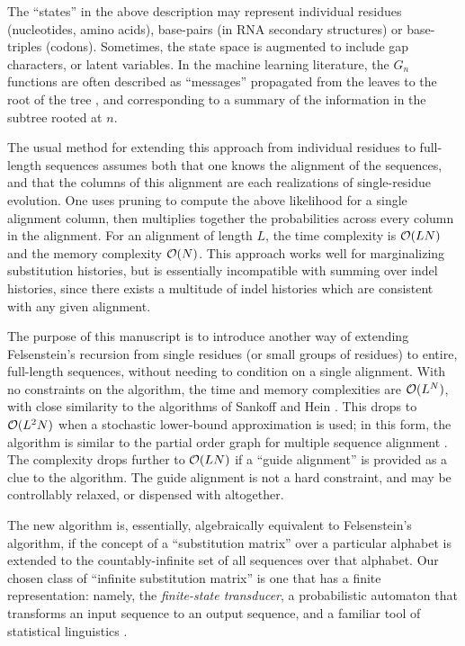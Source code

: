 \documentclass{article}
\begin{document}
The ``states'' in the above description may represent individual residues (nucleotides, amino acids), base-pairs (in RNA secondary structures) or base-triples (codons).
Sometimes, the state space is augmented to include gap characters, or latent variables.
In the machine learning literature, the $G_n$ functions are often described as ``messages'' propagated from the leaves to the root of the tree \cite{KschischangEtAl98},
and corresponding to a summary of the information in the subtree rooted at $n$.

The usual method for extending this approach from individual residues to full-length sequences assumes both that one knows the alignment of the sequences, 
and that the columns of this alignment are each realizations of single-residue evolution.  
One uses pruning to compute the above likelihood for a single alignment column,
then multiplies together the probabilities across every column in the alignment.
For an alignment of length $L$, the time complexity is ${\cal O}(LN)$ and the memory complexity ${\cal O}(N)$.
This approach works well for marginalizing substitution histories, but is essentially incompatible with summing over indel histories,
since there exists a multitude of indel histories which are consistent with any given alignment.

The purpose of this manuscript is to introduce another way of extending Felsenstein's recursion from single residues (or small groups of residues)
to entire, full-length sequences, without needing to condition on a single alignment.
With no constraints on the algorithm,
the time and memory complexities are ${\cal O}(L^N)$,
with close similarity to the algorithms of Sankoff \cite{SankoffCedergren83} and Hein \cite{Hein2001}.
This drops to ${\cal O}(L^2 N)$ when a stochastic lower-bound approximation is used; in this form,
the algorithm is similar to the partial order graph for multiple sequence alignment \cite{LeeGrassoSharlow2002}.
The complexity drops further to ${\cal O}(LN)$ if a ``guide alignment'' is provided as a clue to the algorithm.
The guide alignment is not a hard constraint,
and may be controllably relaxed, or dispensed with altogether.

The new algorithm is, essentially, algebraically equivalent to Felsenstein's algorithm,
if the concept of a ``substitution matrix'' over a particular alphabet is extended to the countably-infinite set of all sequences over that alphabet.
Our chosen class of ``infinite substitution matrix'' is one that has a finite representation:
namely, the {\em finite-state transducer}, a probabilistic automaton that transforms an input sequence to an output sequence,
and a familiar tool of statistical linguistics \cite{MohriPereiraRiley2000}.
\end{document}

